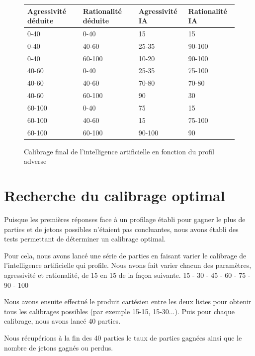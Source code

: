 \documentclass{report}
\begin{document}
\begin{figure}[H]
\begin{center}
\begin{tabular}{|l|l|l|l|}
\hline
Agressivité déduite &	Rationalité déduite &	Agressivité IA & 	Rationalité IA\\
\hline
0-40	 & 0-40 &	15 &	15\\
\hline
0-40 &	40-60 &	25-35 &	90-100\\
\hline
0-40	 & 60-100 &	10-20 &	90-100\\
\hline
40-60 &	0-40 &	25-35 &	75-100\\
\hline
40-60 &	40-60 &	70-80 & 70-80\\
\hline
40-60 &	60-100 &	 90 &	30\\
\hline
60-100 &	 0-40 &	75 & 	15\\
\hline
60-100 & 	40-60 &	15 & 	75-100\\
\hline
60-100 &	 60-100 &	90-100 &	90\\
\hline
\end{tabular}
\end{center}
\caption{Calibrage final de l'intelligence artificielle en fonction du profil adverse}
\end{figure}


\section{Recherche du calibrage optimal}

\hspace{0.5cm}Puisque les premières réponses face à un profilage établi pour gagner le plus de parties et de jetons possibles n'étaient pas concluantes, nous avons établi des tests permettant de déterminer un calibrage optimal.\par
Pour cela, nous avons lancé une série de parties en faisant varier le calibrage de l'intelligence artificielle qui profile. Nous avons fait varier chacun des paramètres, agressivité et rationalité, de 15 en 15 de la façon suivante.
15 - 30 - 45 - 60 - 75 - 90 - 100

Nous avons ensuite effectué le produit cartésien entre les deux listes pour obtenir tous les calibrages possibles (par exemple 15-15, 15-30...). Puis pour chaque calibrage, nous avons lancé 40 parties.\par

Nous récupérions à la fin des 40 parties le taux de parties gagnées ainsi que le nombre de jetons gagnés ou perdus.
\end{document}

